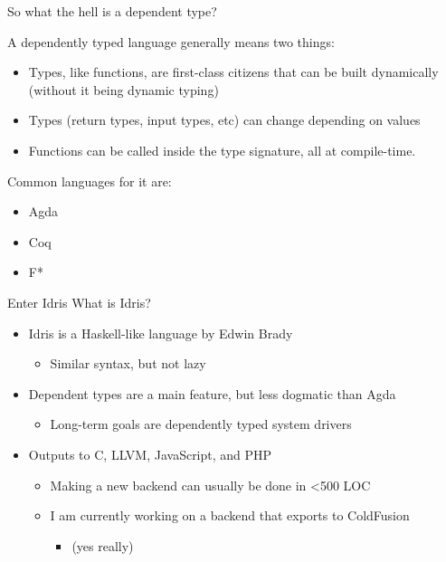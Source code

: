\documentclass{beamer}
\begin{document}
\begin{frame}{So what the hell is a dependent type? }
	\transdissolve[duration=0.3]

	A dependently typed language generally means two things:
	\begin{itemize}	
		\pause
		\item Types, like functions, are first-class citizens that can be built dynamically (without it being dynamic typing)
		\pause
		\item Types (return types, input types, etc) can change depending on values
			\pause
			\item Functions can be called inside the type signature, all at compile-time.
			\pause
	\end{itemize}

	Common languages for it are: 
	\begin{itemize}	
		\item Agda
		\item Coq 
		\item F*
	\end{itemize}
\end{frame}
\begin{frame}{Enter Idris}
	\transdissolve[duration=0.3]
	What is Idris? 
	\begin{itemize}
		\pause
		\item Idris is a Haskell-like language by Edwin Brady \begin{itemize}
				\item Similar syntax, but not lazy
	\end{itemize}
	\pause
     \item Dependent types are a main feature, but less dogmatic than Agda \begin{itemize}
		\item Long-term goals are dependently typed system drivers
	\end{itemize}
		\pause
		\item Outputs to C, LLVM, JavaScript, and PHP \begin{itemize}
				\item Making a new backend can usually be done in \textless 500 LOC
				\pause
				\item I am currently working on a backend that exports to ColdFusion \begin{itemize}
					\pause
					\item[](yes really)
				\end{itemize}
			\end{itemize}
	\end{itemize}
\end{frame}
\end{document}
